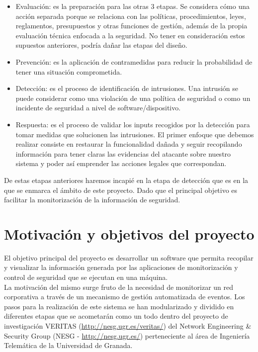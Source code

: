 \begin{itemize}
\item Evaluación: es la preparación para las otras 3 etapas. Se considera cómo una acción separada porque se relaciona con las políticas, procedimientos, leyes, reglamentos, presupuestos y otras funciones de gestión, además de la propia evaluación técnica enfocada a la seguridad. No tener en consideración estos supuestos anteriores, podría dañar las etapas del diseño.
\item Prevención: es la aplicación de contramedidas para reducir la probabilidad de tener una situación comprometida.
\item Detección: es el proceso de identificación de intrusiones. Una intrusión se puede considerar como una violación de una política de seguridad o como un incidente de seguridad a nivel de software/dispositivo.
\item Respuesta: es el proceso de validar los inputs recogidos por la detección para tomar medidas que solucionen las intrusiones. El primer enfoque que debemos realizar consiste en restaurar la funcionalidad dañada y seguir recopilando información para tener claras las evidencias del atacante sobre nuestro sistema y poder así emprender las acciones legales que correspondan.
\end{itemize}

De estas etapas anteriores haremos incapié en la etapa de detección que es en la que se enmarca el ámbito de este proyecto. Dado que el principal objetivo es facilitar la monitorización de la información de seguridad.

\section{Motivación y objetivos del proyecto}

El objetivo principal del proyecto es desarrollar un software que permita recopilar y visualizar la información generada por las aplicaciones de monitorización y control de seguridad que se ejecutan en una máquina.\\

La motivación del mismo surge fruto de la necesidad de monitorizar un red corporativa a través de un mecanismo de gestión automatizada de eventos. Los pasos para la realización de este sistema se han modularizado y dividido en diferentes etapas que se acometarán como un todo dentro del proyecto de investigación VERITAS (\url{http://nesg.ugr.es/veritas/}) del Network Engineering \& Security Group (NESG - \url{http://nesg.ugr.es/}) perteneciente al área de Ingeniería Telemática de la Universidad de Granada.\\


